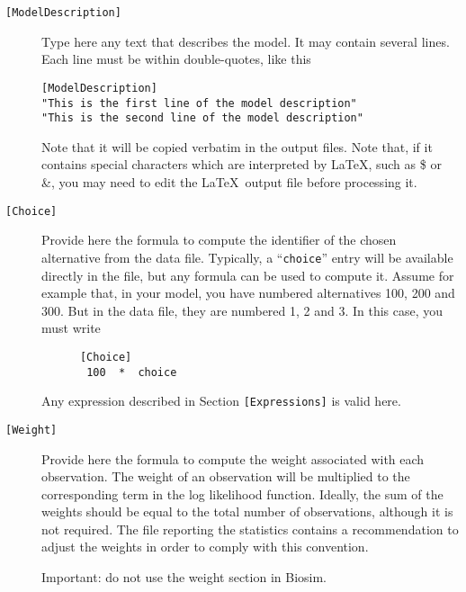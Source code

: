 \documentclass[12pt,a4paper]{article}
\newcommand{\specitem}[1]{\texttt{[#1]}}
\newcommand{\note}[1]{}
\begin{document}
\begin{description}

   \item[\specitem{ModelDescription}]
      Type here any text that describes the model. It may contain several lines. Each line must be within double-quotes, like this
\begin{verbatim}
[ModelDescription]
"This is the first line of the model description"
"This is the second line of the model description"
\end{verbatim}

Note that it will be copied verbatim in the output files. Note that,
if it contains special characters which are interpreted by \LaTeX ,
such as \$ or \&, you may need to edit the \LaTeX\ output file before
processing it.

   \item[\specitem{Choice}] Provide here the formula to compute the identifier of
      the chosen alternative from the data file. Typically, a ``\verb+choice+''
      entry will be available directly in the file, but any formula can be used to
      compute it. 
Assume for example that, in your model, you have numbered alternatives 100, 200 and
300. But in the data file, they are numbered 1, 2 and 3. In this case, you must write 

      \begin{verbatim}
      [Choice]
       100  *  choice  
      \end{verbatim}
 Any expression  described in Section \verb+[Expressions]+ is valid here.

   \item[\specitem{Weight}] Provide here the formula to compute the
      weight associated with each observation. The weight of an observation
      will be multiplied to the corresponding term in the log likelihood
      function. Ideally, the sum of the weights should be equal to the
      total number of observations, although it is not required. The file
      reporting the statistics contains a recommendation to adjust the
      weights in order to comply with this convention.

\note{Check what happens if biosim is called with weights}
      Important: do not use the weight section in Biosim.


\end{description}
\end{document}

